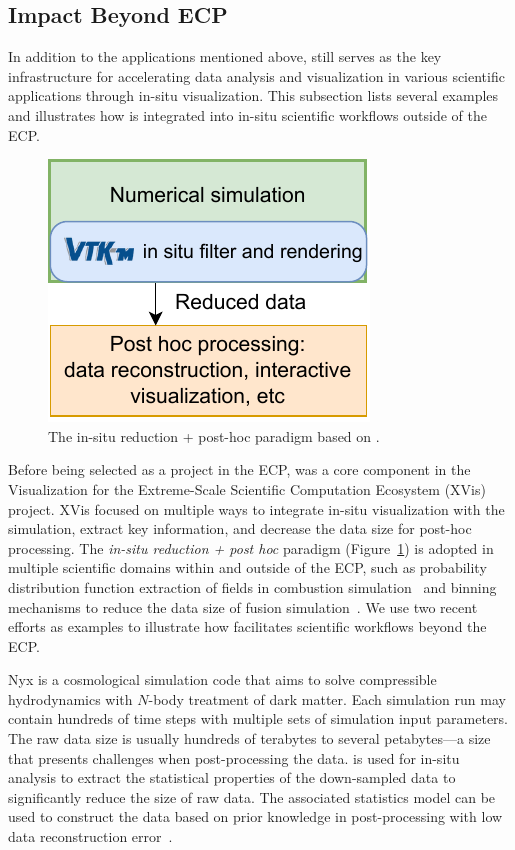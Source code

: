 \subsection{Impact Beyond ECP}


In addition to the applications mentioned above, \vtkm still serves as the key infrastructure for accelerating data analysis and visualization in various scientific applications through in-situ visualization. This subsection lists several examples and illustrates how \vtkm is integrated into in-situ scientific workflows outside of the ECP.


\begin{figure}[htb]
  \centering
\includegraphics[width=0.60\linewidth]{figures/vtkm_insitu_posthoc}
\caption{The in-situ reduction + post-hoc paradigm based on \vtkm.}
\label{fig:vtkm_insitu_posthoc}
\end{figure}

Before being selected as a project in the ECP, \vtkm was a core component in the Visualization for the Extreme-Scale Scientific Computation Ecosystem (XVis)~\citep{Moreland2019} project. 
XVis focused on multiple ways to integrate in-situ visualization with the simulation, extract key information, and decrease the data size for post-hoc processing.
The \textit{in-situ reduction + post hoc} paradigm (Figure~\ref{fig:vtkm_insitu_posthoc}) is adopted in multiple scientific domains within and outside of the ECP, such as probability distribution function extraction of fields in combustion simulation~\citep{Ye2016} and binning mechanisms to reduce the data size of fusion simulation~\citep{Kress2018}. We use two recent efforts as examples to illustrate how \vtkm facilitates scientific workflows beyond the ECP.


Nyx is a cosmological simulation code that aims to solve compressible hydrodynamics with $N$-body treatment of dark matter. Each simulation run may contain hundreds of time steps with multiple sets of simulation input parameters. The raw data size is usually hundreds of terabytes to several petabytes---a size that presents challenges when post-processing the data. 
\vtkm is used for in-situ analysis to extract the statistical properties of the down-sampled data to significantly reduce the size of raw data. The associated statistics model can be used to construct the data based on prior knowledge in post-processing with low data reconstruction error~\citep{Wang2019}.

